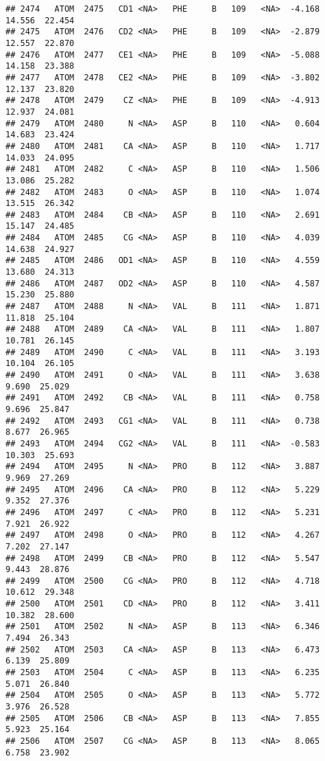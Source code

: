 \documentclass[
]{article}
\begin{document}
\begin{verbatim}
## 2474   ATOM  2475   CD1 <NA>   PHE     B   109   <NA>  -4.168  14.556  22.454
## 2475   ATOM  2476   CD2 <NA>   PHE     B   109   <NA>  -2.879  12.557  22.870
## 2476   ATOM  2477   CE1 <NA>   PHE     B   109   <NA>  -5.088  14.158  23.388
## 2477   ATOM  2478   CE2 <NA>   PHE     B   109   <NA>  -3.802  12.137  23.820
## 2478   ATOM  2479    CZ <NA>   PHE     B   109   <NA>  -4.913  12.937  24.081
## 2479   ATOM  2480     N <NA>   ASP     B   110   <NA>   0.604  14.683  23.424
## 2480   ATOM  2481    CA <NA>   ASP     B   110   <NA>   1.717  14.033  24.095
## 2481   ATOM  2482     C <NA>   ASP     B   110   <NA>   1.506  13.086  25.282
## 2482   ATOM  2483     O <NA>   ASP     B   110   <NA>   1.074  13.515  26.342
## 2483   ATOM  2484    CB <NA>   ASP     B   110   <NA>   2.691  15.147  24.485
## 2484   ATOM  2485    CG <NA>   ASP     B   110   <NA>   4.039  14.638  24.927
## 2485   ATOM  2486   OD1 <NA>   ASP     B   110   <NA>   4.559  13.680  24.313
## 2486   ATOM  2487   OD2 <NA>   ASP     B   110   <NA>   4.587  15.230  25.880
## 2487   ATOM  2488     N <NA>   VAL     B   111   <NA>   1.871  11.818  25.104
## 2488   ATOM  2489    CA <NA>   VAL     B   111   <NA>   1.807  10.781  26.145
## 2489   ATOM  2490     C <NA>   VAL     B   111   <NA>   3.193  10.104  26.105
## 2490   ATOM  2491     O <NA>   VAL     B   111   <NA>   3.638   9.690  25.029
## 2491   ATOM  2492    CB <NA>   VAL     B   111   <NA>   0.758   9.696  25.847
## 2492   ATOM  2493   CG1 <NA>   VAL     B   111   <NA>   0.738   8.677  26.965
## 2493   ATOM  2494   CG2 <NA>   VAL     B   111   <NA>  -0.583  10.303  25.693
## 2494   ATOM  2495     N <NA>   PRO     B   112   <NA>   3.887   9.969  27.269
## 2495   ATOM  2496    CA <NA>   PRO     B   112   <NA>   5.229   9.352  27.376
## 2496   ATOM  2497     C <NA>   PRO     B   112   <NA>   5.231   7.921  26.922
## 2497   ATOM  2498     O <NA>   PRO     B   112   <NA>   4.267   7.202  27.147
## 2498   ATOM  2499    CB <NA>   PRO     B   112   <NA>   5.547   9.443  28.876
## 2499   ATOM  2500    CG <NA>   PRO     B   112   <NA>   4.718  10.612  29.348
## 2500   ATOM  2501    CD <NA>   PRO     B   112   <NA>   3.411  10.382  28.600
## 2501   ATOM  2502     N <NA>   ASP     B   113   <NA>   6.346   7.494  26.343
## 2502   ATOM  2503    CA <NA>   ASP     B   113   <NA>   6.473   6.139  25.809
## 2503   ATOM  2504     C <NA>   ASP     B   113   <NA>   6.235   5.071  26.840
## 2504   ATOM  2505     O <NA>   ASP     B   113   <NA>   5.772   3.976  26.528
## 2505   ATOM  2506    CB <NA>   ASP     B   113   <NA>   7.855   5.923  25.164
## 2506   ATOM  2507    CG <NA>   ASP     B   113   <NA>   8.065   6.758  23.902

\end{verbatim}
\end{document}
